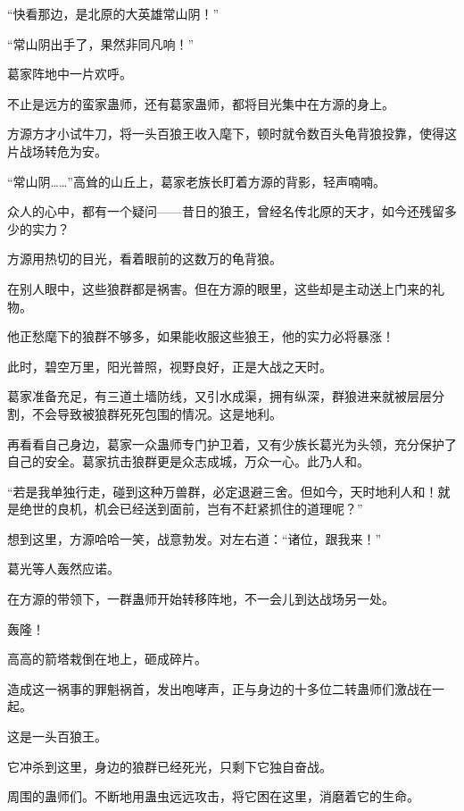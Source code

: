 
\begin{this_body}



“快看那边，是北原的大英雄常山阴！”

“常山阴出手了，果然非同凡响！”

葛家阵地中一片欢呼。

不止是远方的蛮家蛊师，还有葛家蛊师，都将目光集中在方源的身上。

方源方才小试牛刀，将一头百狼王收入麾下，顿时就令数百头龟背狼投靠，使得这片战场转危为安。

“常山阴……”高耸的山丘上，葛家老族长盯着方源的背影，轻声喃喃。

众人的心中，都有一个疑问——昔日的狼王，曾经名传北原的天才，如今还残留多少的实力？

方源用热切的目光，看着眼前的这数万的龟背狼。

在别人眼中，这些狼群都是祸害。但在方源的眼里，这些却是主动送上门来的礼物。

他正愁麾下的狼群不够多，如果能收服这些狼王，他的实力必将暴涨！

此时，碧空万里，阳光普照，视野良好，正是大战之天时。

葛家准备充足，有三道土墙防线，又引水成渠，拥有纵深，群狼进来就被层层分割，不会导致被狼群死死包围的情况。这是地利。

再看看自己身边，葛家一众蛊师专门护卫着，又有少族长葛光为头领，充分保护了自己的安全。葛家抗击狼群更是众志成城，万众一心。此乃人和。

“若是我单独行走，碰到这种万兽群，必定退避三舍。但如今，天时地利人和！就是绝世的良机，机会已经送到面前，岂有不赶紧抓住的道理呢？”

想到这里，方源哈哈一笑，战意勃发。对左右道：“诸位，跟我来！”

葛光等人轰然应诺。

在方源的带领下，一群蛊师开始转移阵地，不一会儿到达战场另一处。

轰隆！

高高的箭塔栽倒在地上，砸成碎片。

造成这一祸事的罪魁祸首，发出咆哮声，正与身边的十多位二转蛊师们激战在一起。

这是一头百狼王。

它冲杀到这里，身边的狼群已经死光，只剩下它独自奋战。

周围的蛊师们。不断地用蛊虫远远攻击，将它困在这里，消磨着它的生命。


\end{this_body}
